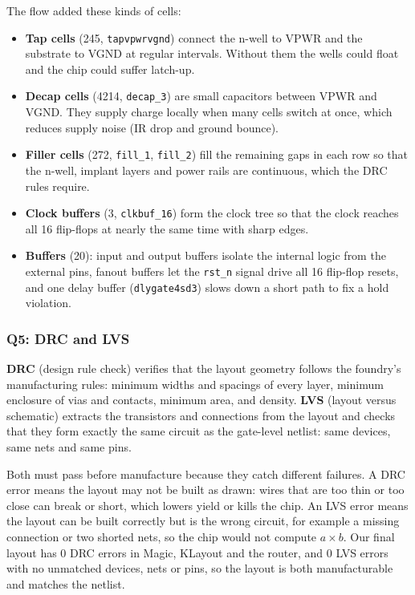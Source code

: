 \documentclass[11pt,a4paper]{article}
\begin{document}
The flow added these kinds of cells:
\begin{itemize}
  \item \textbf{Tap cells} (245, \texttt{tapvpwrvgnd}) connect the n-well to
        VPWR and the substrate to VGND at regular intervals. Without them the
        wells could float and the chip could suffer latch-up.
  \item \textbf{Decap cells} (4214, \texttt{decap\_3}) are small capacitors
        between VPWR and VGND. They supply charge locally when many cells
        switch at once, which reduces supply noise (IR drop and ground
        bounce).
  \item \textbf{Filler cells} (272, \texttt{fill\_1}, \texttt{fill\_2}) fill
        the remaining gaps in each row so that the n-well, implant layers
        and power rails are continuous, which the DRC rules require.
  \item \textbf{Clock buffers} (3, \texttt{clkbuf\_16}) form the clock tree
        so that the clock reaches all 16 flip-flops at nearly the same time
        with sharp edges.
  \item \textbf{Buffers} (20): input and output buffers isolate the internal
        logic from the external pins, fanout buffers let the \texttt{rst\_n}
        signal drive all 16 flip-flop resets, and one delay buffer
        (\texttt{dlygate4sd3}) slows down a short path to fix a hold
        violation.
\end{itemize}

\subsubsection{Q5: DRC and LVS}

\textbf{DRC} (design rule check) verifies that the layout geometry follows
the foundry's manufacturing rules: minimum widths and spacings of every
layer, minimum enclosure of vias and contacts, minimum area, and density.
\textbf{LVS} (layout versus schematic) extracts the transistors and
connections from the layout and checks that they form exactly the same
circuit as the gate-level netlist: same devices, same nets and same pins.

Both must pass before manufacture because they catch different failures.
A DRC error means the layout may not be built as drawn: wires that are too
thin or too close can break or short, which lowers yield or kills the chip.
An LVS error means the layout can be built correctly but is the wrong
circuit, for example a missing connection or two shorted nets, so the chip
would not compute $a \times b$. Our final layout has 0 DRC errors in Magic,
KLayout and the router, and 0 LVS errors with no unmatched devices, nets or
pins, so the layout is both manufacturable and matches the netlist.
\end{document}
